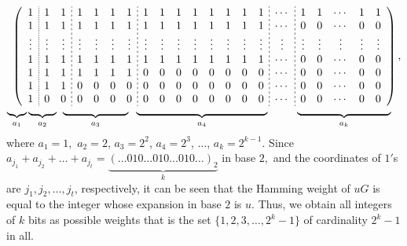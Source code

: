 \documentclass[12pt]{article}
\theoremstyle{definition}
\begin{document}
\[
\begin{array}{c@{\hspace{-5pt}}l}
\left(\begin{array}{c;{1pt/1pt}cc;{2pt/2pt}cccc;{2pt/2pt}cccccccc;{2pt/2pt}c;{2pt/2pt}ccccc}
  1      & 1      & 1      & 1 & 1 & 1 & 1   &1&1&1&1&1&1&1&1& \cdots & 1 & 1 & \cdots & 1 & 1\\
    1      & 1      & 1      & 1 & 1 & 1 & 1   &1&1&1&1&1&1&1&1& \cdots & 0 & 0 & \cdots & 0 & 0\\
    \vdots & \vdots & \vdots & \vdots & \vdots &\vdots&\vdots&\vdots&\vdots&\vdots&\vdots&\vdots&\vdots& \vdots & \vdots & \vdots & \vdots & \vdots & \vdots & \vdots & \vdots\\
    1      & 1      & 1      & 1 & 1 & 1 & 1   &1&1&1&1&1&1&1&1& \cdots & 0 & 0 & \cdots & 0 & 0\\
    1      & 1      & 1      & 1 & 1 & 1 & 1   &0&0&0&0&0&0&0&0& \cdots & 0 & 0 & \cdots & 0 & 0\\
    1      & 1      & 1      & 0 & 0 & 0 & 0   &0&0&0&0&0&0&0&0& \cdots & 0 & 0 & \cdots & 0 & 0\\
    1      & 0      & 0      & 0 & 0 & 0 & 0   &0&0&0&0&0&0&0&0& \cdots & 0 & 0 & \cdots & 0 & 0\\
\end{array}\right),
&\\[-4pt]
\begin{array}{cccccccccc}
\hspace*{-0.5cm}\underbrace{\rule{0.05cm}{0mm}}_{a_1}&
\hspace*{-0.3cm}\underbrace{\rule{9mm}{0mm}}_{a_2} &
\hspace*{-0.15cm}\underbrace{\rule{21mm}{0mm}}_{a_3} &
\hspace*{-0.1cm}\underbrace{\rule{4.2cm}{0mm}}_{a_4} &
\hspace*{0.6cm}\underbrace{\rule{3cm}{0mm}}_{a_k}\end{array} &
\end{array}
\]
where $a_1=1,$ $a_2=2$, $a_3=2^2$, $a_4=2^3$, $\ldots$, $a_k=2^{k-1}.$
Since $a_{j_1}+a_{j_2}+\ldots+a_{j_t}= \underbrace{{(\ldots010\ldots010\ldots010\ldots)}_2}_k$ in base $2,$ and the coordinates of $1'$s are $j_1,j_2,\ldots,j_t$, respectively,
it can be seen that the Hamming weight of $uG$ is equal to the integer whose expansion in base $2$ is $u.$
Thus, we obtain all integers of $k$ bits as possible weights that is the set
$\{1,2,3,\dots,2^k-1\}$
of cardinality $2^k-1$ in all.
\end{document}
